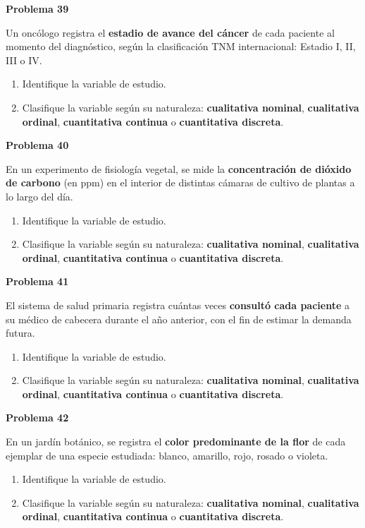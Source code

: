 \documentclass[10pt,letterpaper]{article}
\newcommand{\problema}[1]{%
  \vspace{2pt}%
  \begin{tcolorbox}[
    enhanced,
    colback=white,
    colframe=black,
    arc=0pt,
    boxrule=0pt,
    leftrule=2pt,
    left=6pt, right=6pt,
    top=1pt, bottom=1pt,
  ]
    {\normalsize\bfseries\sffamily #1}
  \end{tcolorbox}%
  \vspace{1pt}%
}
\begin{document}
\problema{Problema 39}
\noindent\sffamily\small Un oncólogo registra el \textbf{estadio de avance del c\'ancer} de cada paciente al momento del diagn\'ostico, seg\'un la clasificaci\'on TNM internacional: Estadio I, II, III o IV.
\begin{enumerate}[leftmargin=1.2cm, label=\textbf{\alph*)}, itemsep=0pt, topsep=2pt]
  \item Identifique la variable de estudio.
  \item Clasifique la variable seg\'un su naturaleza: \textbf{cualitativa nominal}, \textbf{cualitativa ordinal}, \textbf{cuantitativa continua} o \textbf{cuantitativa discreta}.
\end{enumerate}

\problema{Problema 40}
\noindent\sffamily\small En un experimento de fisiolog\'ia vegetal, se mide la \textbf{concentraci\'on de di\'oxido de carbono} (en ppm) en el interior de distintas c\'amaras de cultivo de plantas a lo largo del d\'ia.
\begin{enumerate}[leftmargin=1.2cm, label=\textbf{\alph*)}, itemsep=0pt, topsep=2pt]
  \item Identifique la variable de estudio.
  \item Clasifique la variable seg\'un su naturaleza: \textbf{cualitativa nominal}, \textbf{cualitativa ordinal}, \textbf{cuantitativa continua} o \textbf{cuantitativa discreta}.
\end{enumerate}

\newpage

\problema{Problema 41}
\noindent\sffamily\small El sistema de salud primaria registra cu\'antas veces \textbf{consult\'o cada paciente} a su m\'edico de cabecera durante el a\~no anterior, con el fin de estimar la demanda futura.
\begin{enumerate}[leftmargin=1.2cm, label=\textbf{\alph*)}, itemsep=0pt, topsep=2pt]
  \item Identifique la variable de estudio.
  \item Clasifique la variable seg\'un su naturaleza: \textbf{cualitativa nominal}, \textbf{cualitativa ordinal}, \textbf{cuantitativa continua} o \textbf{cuantitativa discreta}.
\end{enumerate}

\problema{Problema 42}
\noindent\sffamily\small En un jard\'in bot\'anico, se registra el \textbf{color predominante de la flor} de cada ejemplar de una especie estudiada: blanco, amarillo, rojo, rosado o violeta.
\begin{enumerate}[leftmargin=1.2cm, label=\textbf{\alph*)}, itemsep=0pt, topsep=2pt]
  \item Identifique la variable de estudio.
  \item Clasifique la variable seg\'un su naturaleza: \textbf{cualitativa nominal}, \textbf{cualitativa ordinal}, \textbf{cuantitativa continua} o \textbf{cuantitativa discreta}.
\end{enumerate}
\end{document}
